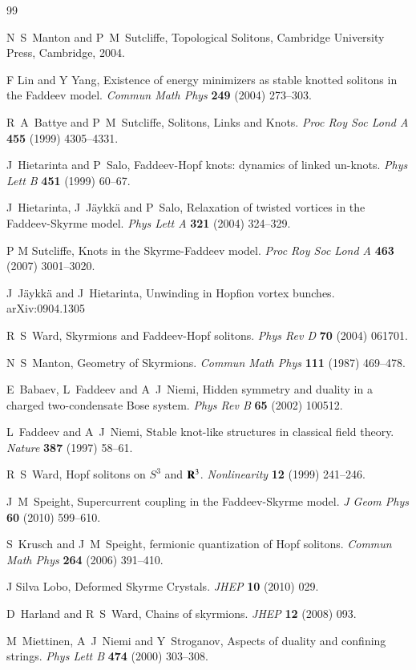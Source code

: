 \documentclass[5p]{elsarticle}
\begin{document}
\begin{thebibliography}{99}

N~S~Manton and P~M~Sutcliffe, Topological Solitons,
         Cambridge University Press, Cambridge, 2004.

F Lin and Y Yang, Existence of energy minimizers as stable knotted solitons
in the Faddeev model.
       {\it Commun Math Phys} {\bf249} (2004) 273--303.

R~A~Battye and P~M~Sutcliffe, Solitons, Links and Knots.
    {\it Proc Roy Soc Lond A} {\bf455} (1999) 4305--4331.

J~Hietarinta and P~Salo, Faddeev-Hopf knots: dynamics of linked un-knots.
    {\it Phys Lett B} {\bf451} (1999) 60--67.

J~Hietarinta, J~J\"aykk\"a and P~Salo, Relaxation of twisted vortices in the
  Faddeev-Skyrme model. {\it Phys Lett A} {\bf321} (2004) 324--329.

P M Sutcliffe, Knots in the Skyrme-Faddeev model.
    {\it Proc Roy Soc Lond A} {\bf463} (2007) 3001--3020.

J~J\"aykk\"a and J~Hietarinta, Unwinding in Hopfion vortex bunches.
    arXiv:0904.1305  %

R~S~Ward, Skyrmions and Faddeev-Hopf solitons.
       {\it Phys Rev D} {\bf70} (2004) 061701.

N~S~Manton, Geometry of Skyrmions.
         {\it Commun Math Phys} {\bf111} (1987) 469--478.

E~Babaev, L~Faddeev and A~J~Niemi, Hidden symmetry and duality in a charged
   two-condensate Bose system. {\it Phys Rev B} {\bf65} (2002) 100512.

L~Faddeev and A~J~Niemi, Stable knot-like structures in classical field theory.
    {\it Nature} {\bf387} (1997) 58--61.

R~S~Ward, Hopf solitons on $S^3$ and ${\bf R}^3$.
   {\it Nonlinearity} {\bf12} (1999) 241--246.

J~M~Speight, Supercurrent coupling in the Faddeev-Skyrme model.
         {\it J Geom Phys} {\bf60} (2010) 599--610.

S~Krusch and J~M~Speight, fermionic quantization of Hopf solitons.
         {\it Commun Math Phys} {\bf264} (2006) 391--410.

J Silva Lobo, Deformed Skyrme Crystals. {\it JHEP} {\bf10} (2010) 029.

D~Harland and R~S~Ward, Chains of skyrmions. {\it JHEP} {\bf12} (2008) 093.

M~Miettinen, A~J~Niemi and Y~Stroganov, Aspects of duality and
  confining strings. {\it Phys Lett B} {\bf474} (2000) 303--308.

\end{thebibliography}
\end{document}
